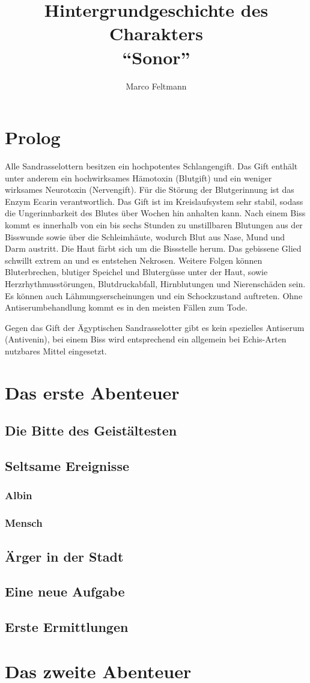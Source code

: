 \documentclass{report}
\author{Marco Feltmann}
\title{Hintergrundgeschichte des Charakters \\ \enquote{Sonor} }
\begin{document}
	\maketitle
	
	\tableofcontents

	\chapter{Prolog}
Alle Sandrasselottern besitzen ein hochpotentes Schlangengift. Das Gift enthält
unter anderem ein hochwirksames Hämotoxin (Blutgift) und ein weniger wirksames
Neurotoxin (Nervengift). Für die Störung der Blutgerinnung ist das Enzym Ecarin
verantwortlich. Das Gift ist im Kreislaufsystem sehr stabil, sodass die
Ungerinnbarkeit des Blutes über Wochen hin anhalten kann. Nach einem Biss kommt
es innerhalb von ein bis sechs Stunden zu unstillbaren Blutungen aus der
Bisswunde sowie über die Schleimhäute, wodurch Blut aus Nase, Mund und Darm
austritt. Die Haut färbt sich um die Bissstelle herum. Das gebissene Glied
schwillt extrem an und es entstehen Nekrosen. Weitere Folgen können
Bluterbrechen, blutiger Speichel und Blutergüsse unter der Haut, sowie
Herzrhythmusstörungen, Blutdruckabfall, Hirnblutungen und Nierenschäden sein. Es
können auch Lähmungserscheinungen und ein Schockzustand auftreten. Ohne
Antiserumbehandlung kommt es in den meisten Fällen zum Tode.

Gegen das Gift der Ägyptischen Sandrasselotter gibt es kein spezielles Antiserum
(Antivenin), bei einem Biss wird entsprechend ein allgemein bei Echis-Arten
nutzbares Mittel eingesetzt.

\chapter[Datum erstes Spiel]{Das erste Abenteuer}
\section{Die Bitte des Geistältesten}

\section{Seltsame Ereignisse}
\subsection{Albin}
\subsection{Mensch}

\section{Ärger in der Stadt}

\section{Eine neue Aufgabe}

\section{Erste Ermittlungen}


\chapter[Datum zweites Spiel]{Das zweite Abenteuer}
\end{document}
